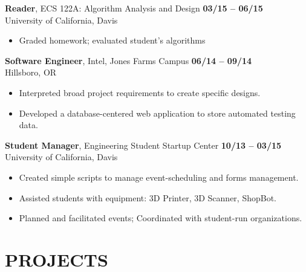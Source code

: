 \documentclass[10pt, letterpaper]{res}
\begin{document}
\begin{resume}
    {\bf Reader}, ECS 122A: Algorithm Analysis and Design \hfill {\bf 03/15 -- 06/15}\\
	University of California, Davis
	\begin{itemize}[noitemsep]	 
        \item Graded homework; evaluated student's algorithms
    \end{itemize}

    {\bf Software Engineer}, Intel, Jones Farms Campus \hfill {\bf 06/14 -- 09/14} \\
    Hillsboro, OR
    \begin{itemize}[noitemsep]
        \item Interpreted broad project requirements to create specific designs.
        \item Developed a database-centered web application to store automated testing data.
    \end{itemize}

    {\bf Student Manager}, Engineering Student Startup Center \hfill {\bf 10/13 -- 03/15} \\
    University of California, Davis
    \begin{itemize}[noitemsep] %
        \item Created simple scripts to manage event-scheduling and forms management.
        \item Assisted students with equipment: 3D Printer, 3D Scanner, ShopBot.
        \item Planned and facilitated events; Coordinated with student-run organizations.
    \end{itemize}
%


\section{PROJECTS}


\end{resume}
\end{document}
